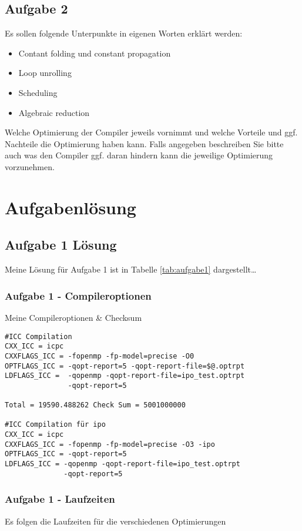 \documentclass{article}
\begin{document}
  \subsection{Aufgabe 2} 
  Es sollen folgende Unterpunkte in eigenen Worten erklärt werden:
  \begin{itemize}
    \item Contant folding und constant propagation
    \item Loop unrolling
    \item Scheduling
    \item Algebraic reduction
  \end{itemize}
Welche Optimierung der Compiler jeweils vornimmt und welche Vorteile und ggf.
Nachteile die Optimierung haben kann. Falls angegeben beschreiben Sie bitte
auch was den Compiler ggf. daran hindern kann die jeweilige Optimierung
vorzunehmen.

\newpage

\section{Aufgabenlösung}

\subsection{Aufgabe 1 Lösung} 
Meine Lösung für Aufgabe 1 ist in Tabelle \ref{tab:aufgabe1} dargestellt\dots

\subsubsection{Aufgabe 1 - Compileroptionen}
Meine Compileroptionen \& Checksum
\begin{verbatim}
#ICC Compilation
CXX_ICC = icpc
CXXFLAGS_ICC = -fopenmp -fp-model=precise -O0
OPTFLAGS_ICC = -qopt-report=5 -qopt-report-file=$@.optrpt
LDFLAGS_ICC =  -qopenmp -qopt-report-file=ipo_test.optrpt 
               -qopt-report=5

Total = 19590.488262 Check Sum = 5001000000

#ICC Compilation für ipo
CXX_ICC = icpc
CXXFLAGS_ICC = -fopenmp -fp-model=precise -O3 -ipo
OPTFLAGS_ICC = -qopt-report=5
LDFLAGS_ICC = -qopenmp -qopt-report-file=ipo_test.optrpt 
              -qopt-report=5
\end{verbatim}

\subsubsection{Aufgabe 1 - Laufzeiten}
Es folgen die Laufzeiten für die verschiedenen Optimierungen
\end{document}
